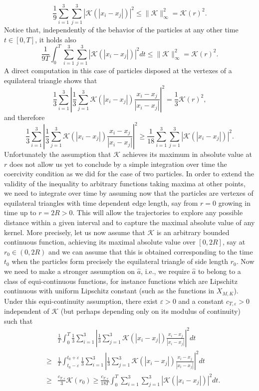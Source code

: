 $$
\frac{1}{9}   \sum_{i=1}^3 \sum_{j=1}^3 |\mathcal K(|x_i-x_j|)|^2  \leq \|\mathcal K\|_\infty^2 = \mathcal K(r)^2.
$$
Notice that, independently of the behavior of the particles at any other time $t \in [0,T]$, it holds also
\begin{equation}\label{maxbound}
\frac{1}{9 T} \int_0^T  \sum_{i=1}^3 \sum_{j=1}^3 |\mathcal K(|x_i-x_j|)|^2  dt \leq \|\mathcal K\|_\infty^2 = \mathcal K(r)^2.
\end{equation}
A direct computation in this case of particles disposed at the vertexes of a equilateral triangle shows that 
$$
 \frac{1}{3} \sum_{i=1}^3 \left | \frac{1}{3} \sum_{j=1}^3 \mathcal K(|x_i-x_j|) \frac{x_i-x_j}{|x_i-x_j|} \right |^2 =\frac{1}{3}  \mathcal K(r)^2,
$$
and therefore
$$ 
\frac{1}{3} \sum_{i=1}^3 \left | \frac{1}{3} \sum_{j=1}^3 \mathcal K(|x_i-x_j|) \frac{x_i-x_j}{|x_i-x_j|} \right |^2 \geq \frac{1}{18}   \sum_{i=1}^3 \sum_{j=1}^3 |\mathcal K(|x_i-x_j|)|^2.
$$
Unfortunately the assumption that $\mathcal K$ achieves its maximum in absolute value at $r$ does not  allow us yet to conclude by a simple integration over time the coercivity condition as we did for the case of two particles. In order to extend the validity of the inequality to arbitrary functions taking maxima at other points, we need to integrate over time by assuming now that the particles are vertexes of equilateral triangles with time dependent edge length, say from $r=0$ growing in time up to $r=2 R>0$. This will allow the trajectories to explore any possible distance within a given interval and to capture the maximal absolute value of  any kernel. More precisely, let us now assume that $\mathcal K$ is an arbitrary bounded continuous function,  achieving its maximal absolute value over $[0,2R]$, say at $r_0 \in (0,2R)$ and we can assume that this is obtained corresponding to the time $t_0$ when the particles form precisely the equilateral triangle of side length $r_0$. Now we need to make a stronger assumption on $\widehat a$, i.e., we require $\widehat a$ to belong to a class of equi-continuous functions, for instance functions which are Lipschitz continuous with uniform Lipschitz constant (such as the functions in $X_{M,K}$).
Under this equi-continuity assumption, there exist $\varepsilon>0$ and a constant $c_{T,\varepsilon}>0$ independent of $\mathcal K$ (but perhaps depending only on its modulus of continuity) such that
\begin{eqnarray*}\label{coercint}
&&\frac{1}{T} \int_0^T \frac{1}{3} \sum_{i=1}^3 \left | \frac{1}{3} \sum_{j=1}^3 \mathcal K(|x_i-x_j|) \frac{x_i-x_j}{|x_i-x_j|} \right |^2 dt \\\
&\geq& \frac{1}{T} \int_{t_0 - \varepsilon}^{t_0+\varepsilon} \frac{1}{3} \sum_{i=1}^3 \left | \frac{1}{3} \sum_{j=1}^3 \mathcal K(|x_i-x_j|) \frac{x_i-x_j}{|x_i-x_j|} \right |^2 dt\\
&\geq & \frac{c_{T,\varepsilon}}{3}  \mathcal K(r_0) \geq \frac{c_{T,\varepsilon}}{18T } \int_0^T  \sum_{i=1}^3 \sum_{j=1}^3 |\mathcal K(|x_i-x_j|)|^2  dt.
\end{eqnarray*}
